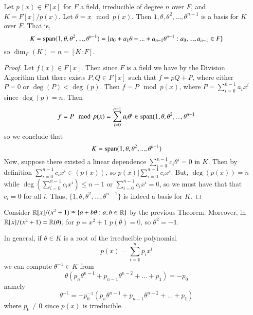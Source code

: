 \begin{theorem}\label{thm:vectext}
    Let $p(x) \in F[x]$ for $F$ a field, irreducible of degree $n$ over $F$, and $K = F[x]/p(x)$. Let $\theta = x\mod p(x)$. Then $1,\theta,\theta^2,...,\theta^{n-1}$ is a basis for $K$ over $F$. That is, \begin{equation}
        K = \operatorname{span}(1,\theta,\theta^2,...,\theta^{n-1}) = \{a_0+a_1\theta+...+a_{n-1}\theta^{n-1}:a_0,...,a_{n-1} \in F\}
    \end{equation}
    so $\dim_F(K) = n = [K:F]$.
\end{theorem}
\begin{proof}
    Let $f(x) \in F[x]$. Then since $F$ is a field we have by the Division Algorithm that there exists $P,Q \in F[x]$ such that $f = pQ+P$, where either $P = 0$ or $\deg(P) <\deg(p)$. Then $f = P\mod p(x)$, where $P = \sum_{i=0}^{n-1}a_ix^i$ since $\deg(p) = n$. Then $$f = P\mod p(x) = \sum_{i=0}^{n-1}a_i\theta^i \in \operatorname{span}(1,\theta,\theta^2,...,\theta^{n-1}$$ so we conclude that $$K = \operatorname{span}(1,\theta,\theta^2,...,\theta^{n-1})$$
    Now, suppose there existed a linear dependence $\sum_{i=0}^{n-1}c_i\theta^i = 0$ in $K$. Then by definition $\sum_{i=0}^{n-1}c_ix^i \in (p(x))$, so $p(x)\vert \sum_{i=0}^{n-1}c_ix^i$. But, $\deg(p(x)) = n$ while $\deg\left(\sum_{i=0}^{n-1}c_ix^i\right) \leq n-1$ or $\sum_{i=0}^{n-1}c_ix^i = 0$, so we must have that that $c_i = 0$ for all $i$. Thus, $\{1,\theta,\theta^2,...,\theta^{n-1}\}$ is indeed a basis for $K$. 
\end{proof}


\begin{example}
    Consider $\mathbb R[x]/(x^2+1) \cong \{a+b\theta:a,b \in \mathbb R\}$ by the previous Theorem. Moreover, in $\mathbb R[x]/(x^2+1) = \mathbb R(\theta)$, for $p = x^2+1$ $p(\theta) = 0$, so $\theta^2 = -1$.
\end{example}


\begin{example}
    In general, if $\theta \in K$ is a root of the irreducible polynomial \begin{equation*}
        p(x) = \sum_{i=0}^np_ix^i
    \end{equation*}
    we can compute $\theta^{-1} \in K$ from \begin{equation*}
        \theta(p_n\theta^{n-1}+p_{n-1}\theta^{n-2}+...+p_1) = -p_0
    \end{equation*}
    namely \begin{equation*}
        \theta^{-1} = -p_0^{-1}(p_n\theta^{n-1}+p_{n-1}\theta^{n-2}+...+p_1)
    \end{equation*}
    where $p_0 \neq 0$ since $p(x)$ is irreducible.
\end{example}


